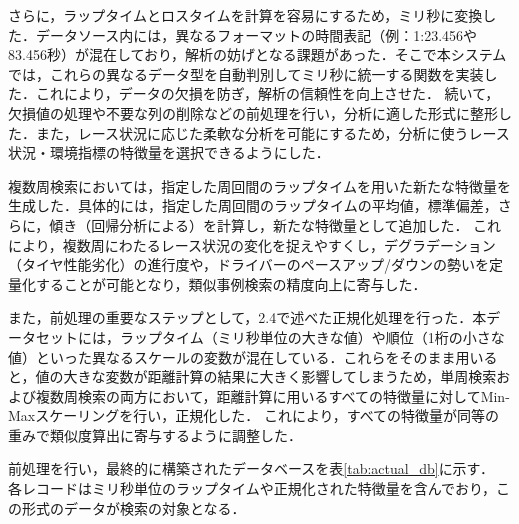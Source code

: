\documentclass{deimj}
\begin{document}
さらに，ラップタイムとロスタイムを計算を容易にするため，ミリ秒に変換した．データソース内には，異なるフォーマットの時間表記（例：1:23.456や83.456秒）が混在しており，解析の妨げとなる課題があった．そこで本システムでは，これらの異なるデータ型を自動判別してミリ秒に統一する関数を実装した．これにより，データの欠損を防ぎ，解析の信頼性を向上させた．
続いて，欠損値の処理や不要な列の削除などの前処理を行い，分析に適した形式に整形した．また，レース状況に応じた柔軟な分析を可能にするため，分析に使うレース状況・環境指標の特徴量を選択できるようにした．

複数周検索においては，指定した周回間のラップタイムを用いた新たな特徴量を生成した．具体的には，指定した周回間のラップタイムの平均値，標準偏差，さらに，傾き（回帰分析による）を計算し，新たな特徴量として追加した．
これにより，複数周にわたるレース状況の変化を捉えやすくし，デグラデーション（タイヤ性能劣化）の進行度や，ドライバーのペースアップ/ダウンの勢いを定量化することが可能となり，類似事例検索の精度向上に寄与した．

また，前処理の重要なステップとして，2.4で述べた正規化処理を行った．本データセットには，ラップタイム（ミリ秒単位の大きな値）や順位（1桁の小さな値）といった異なるスケールの変数が混在している．これらをそのまま用いると，値の大きな変数が距離計算の結果に大きく影響してしまうため，単周検索および複数周検索の両方において，距離計算に用いるすべての特徴量に対してMin-Maxスケーリングを行い，正規化した．
これにより，すべての特徴量が同等の重みで類似度算出に寄与するように調整した．

前処理を行い，最終的に構築されたデータベースを表\ref{tab:actual_db}に示す．
各レコードはミリ秒単位のラップタイムや正規化された特徴量を含んでおり，この形式のデータが検索の対象となる．

\begin{table}[htbp]
  \centering
  \caption{構築されたデータベース（主要な属性のみ抜粋）}
  \label{tab:actual_db}
\end{table}
\end{document}
